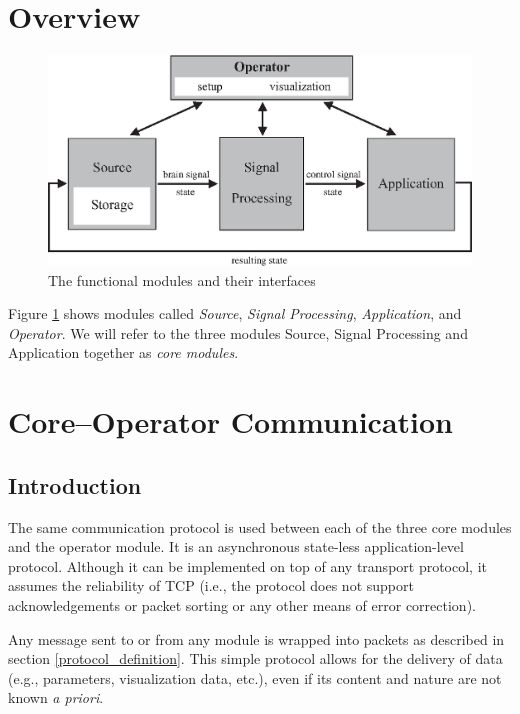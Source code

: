 \documentclass[letterpaper,oneside,12pt]{book}
\begin{document}
\section{Overview}

\begin{figure}[ht]
 \centerline{\includegraphics{figures/modules.eps}}
 \caption{The functional modules and their interfaces}
 \label{fig:modules}
\end{figure}

Figure \ref{fig:modules} shows modules called \textit{Source}, \textit{Signal 
Processing}, \textit{Application}, and \textit{Operator}. We will refer to the 
three modules Source, Signal Processing and Application together as \textit{core 
modules}.




\section{Core--Operator Communication}

\subsection{Introduction}

The same communication protocol is used between each of the three core modules 
and the operator module. It is an asynchronous state-less application-level 
protocol. Although it can be implemented on top of any transport protocol, it 
assumes the reliability of TCP (i.e., the protocol does not support 
acknowledgements or packet sorting or any other means of error correction).

Any message sent to or from any module is wrapped into packets as described in 
section \ref{protocol_definition}. This simple protocol allows for the delivery 
of data (e.g., parameters, visualization data, etc.), even if its content and 
nature are not known \textit{a priori}.
\end{document}
